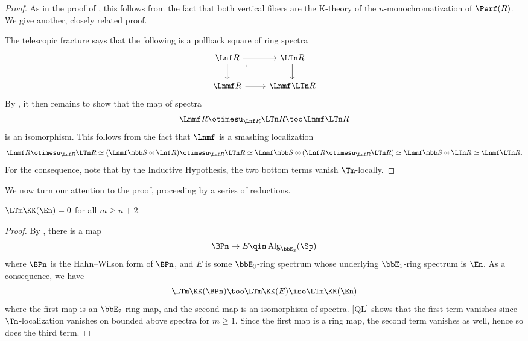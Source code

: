 \begin{proof}
	As in the proof of \cite[Corollary 4.11]{DescVan}, this follows from the fact that both vertical fibers are the K-theory of the $n$-monochromatization of $\Perf(R)$.
	We give another, closely related proof.

	The telescopic fracture says that the following is a pullback square of ring spectra
	\[\begin{tikzcd}
		{\Lnf R} & {\LTn R} \\
		{\Lnmf R} & {\Lnmf\LTn R}
		\arrow[from=1-1, to=1-2]
		\arrow[from=1-1, to=2-1]
		\arrow["\lrcorner"{anchor=center, pos=0.125}, draw=none, from=1-1, to=2-2]
		\arrow[from=1-2, to=2-2]
		\arrow[from=2-1, to=2-2]
	\end{tikzcd}\]
	By \cite[Corollary 1.4]{LT}, it then remains to show that the map of spectra
	\[
		\Lnmf R \otimesu_{\Lnf R} \LTn R \too \Lnmf\LTn R
	\]
	is an isomorphism.
	This follows from the fact that $\Lnmf$ is a smashing localization
	\[
		\Lnmf R \otimesu_{\Lnf R} \LTn R
		\simeq (\Lnmf\SS \otimes \Lnf R) \otimesu_{\Lnf R} \LTn R
		\simeq \Lnmf\SS \otimes (\Lnf R \otimesu_{\Lnf R} \LTn R)
		\simeq \Lnmf\SS \otimes \LTn R
		\simeq \Lnmf\LTn R.
	\]
	For the consequence, note that by the \hyperref[inductive-assumption]{Inductive Hypothesis}, the two bottom terms vanish $\Tm$-locally.
\end{proof}

We now turn our attention to the proof, proceeding by a series of reductions.

\begin{prop}\label{QL-En}
	$\LTm \KK(\En) = 0$ for all $m \geq n{+}2$.
\end{prop}

\begin{proof}
	By \cite[Proposition 8.3]{ABM}, there is a map
	\[
		\BPn \to E
		\qin \Alg_{\bbE_3}(\Sp)
	\]
	where $\BPn$ is the Hahn--Wilson form of $\BPn$, and $E$ is some $\bbE_3$-ring spectrum whose underlying $\bbE_1$-ring spectrum is $\En$.
	As a consequence, we have
	\[
		\LTm \KK(\BPn) \too \LTm \KK(E) \iso \LTm \KK(\En)
	\]
	where the first map is an $\bbE_2$-ring map, and the second map is an isomorphism of spectra.
	\cref{QL} shows that the first term vanishes since $\Tm$-localization vanishes on bounded above spectra for $m \geq 1$.
	Since the first map is a ring map, the second term vanishes as well, hence so does the third term.
\end{proof}

